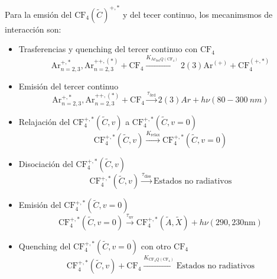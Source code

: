 \documentclass[12pt,a4paper]{article}
\newcommand{\Ar}{\mathrm{Ar}}
\newcommand{\CF}{\mathrm{CF}}
\newcommand{\third}{\mathrm{3rd}}
\begin{document}
Para la emsión del $\CF_4(\tilde{C})^{+,*}$ y del tecer continuo, los mecanimsmos de interacción son:  

\begin{itemize}
    \item  Trasferencias y quenching del tercer continuo con $\CF_4$
    \begin{equation}
        \Ar_{n=2,3}^{+,*},
        \Ar_{n=2,3}^{++,(*)} + \CF_4
        \xrightarrow{K_{\Ar_\third Q(\CF_4)}}  2(3) \Ar^{(+)} + \CF_4^{(+,*)}
    \end{equation}
    \item Emisión del tercer continuo
    \begin{equation}
        \Ar_{n=2,3}^{+,*},
        \Ar_{n=2,3}^{++,(*)} + \CF_4
        \xrightarrow{\tau_\third} 2(3) Ar + h \nu (80-\SI{300}{nm})
    \end{equation}
    \item Relajación del $\CF_4^{+,*}(\tilde{C},v)$ a  $\CF_4^{+,*}(\tilde{C},v=0)$
    \begin{equation}
         \CF_4^{+,*}(\tilde{C},v) \xrightarrow{K_{\mathrm{relax}}}  \CF_4^{+,*}(\tilde{C},v=0)
    \end{equation}
    \item Disociación del $\CF_4^{+,*}(\tilde{C},v)$ 
    \begin{equation}
         \CF_4^{+,*}(\tilde{C},v) \xrightarrow{\tau_{\mathrm{diss}}} \text{Estados no radiativos}
    \end{equation}
    \item Emisión del $\CF_4^{+,*}(\tilde{C},v=0)$ 
    \begin{equation}
         \CF_4^{+,*}(\tilde{C},v=0) \xrightarrow{\tau_{\mathrm{uv}}}  
         \CF_4^{+,*}(\tilde{A},\tilde{X}) + h \nu (290,230\mathrm{nm})
    \end{equation}
    \item Quenching del $\CF_4^{+,*}(\tilde{C},v=0)$ con otro $\CF_4$
    \begin{equation}
         \CF_4^{+,*}(\tilde{C},v) + \CF_4 \xrightarrow{K_{\CF_4 Q(\CF_4)}} \text{Estados no radiativos}
    \end{equation}
\end{itemize}
\end{document}
